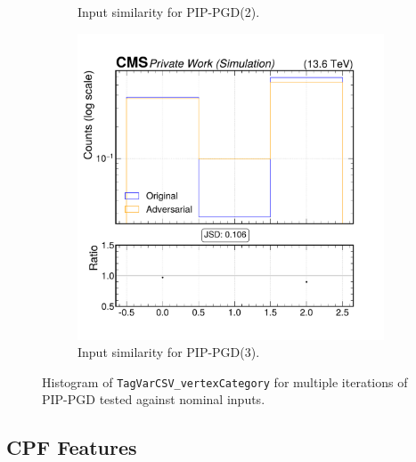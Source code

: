 \begin{figure}[h]
\begin{subfigure}[t]{0.32\textwidth}
    \caption*{Input similarity for PIP-PGD(2).}
  \end{subfigure}\hfill
  \begin{subfigure}[t]{0.32\textwidth}
    \includegraphics[width=\linewidth]{media/output/features/compare/combined_it_3/cmp_global_features_TagVarCSV_vertexCategory.pdf}
    \caption*{Input similarity for PIP-PGD(3).}
  \end{subfigure}

  \caption*{Histogram of \texttt{TagVarCSV\_vertexCategory} for multiple iterations of PIP-PGD tested against nominal inputs.}
  \label{fig:combined_input_TagVarCSV_vertexCategory}
\end{figure}

\FloatBarrier
\newpage
\subsection*{CPF Features}


